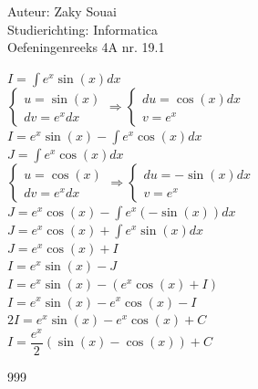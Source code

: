 \documentclass[a4paper]{article}
\begin{document}
  
\noindent \large Auteur: Zaky Souai \\
\noindent \large Studierichting:  Informatica\\
\noindent \large Oefeningenreeks 4A nr. 19.1\\

\bigskip

\normalsize

$I= \displaystyle \int e^x \sin (x) dx$\\

$\left\{\begin{array}{l}
u = \sin (x)\\
dv=e^x dx
\end{array}
\Rightarrow
\left\{\begin{array}{l}
du = \cos(x) dx\\
v=e^x
\end{array}\right.\right.$\\

$I= e^x\sin (x)- \displaystyle \int e^x\cos(x)dx$\\

$J= \displaystyle \int e^x\cos(x)dx$\\

$\left\{\begin{array}{l}
u = \cos (x)\\
dv=e^x dx
\end{array}
\Rightarrow
\left\{\begin{array}{l}
du = -\sin(x) dx\\
v=e^x
\end{array}\right.\right.$\\

$J= e^x\cos (x)- \displaystyle \int e^x(-\sin(x))dx$\\

$J= e^x\cos (x)+ \displaystyle \int e^x\sin(x)dx$\\

$J= e^x\cos (x)+I$\\

$I= e^x\sin (x)-J$\\

$I= e^x\sin (x)-\left(e^x\cos (x)+I\right)$\\

$I= e^x\sin (x)-e^x\cos (x)-I$\\

$2I= e^x\sin (x)-e^x\cos (x) + C$\\

$I= \dfrac{e^x}{2}\left(\sin (x)-\cos (x)\right)+C$


\begin{thebibliography}{999}
\end{thebibliography}
\end{document}
